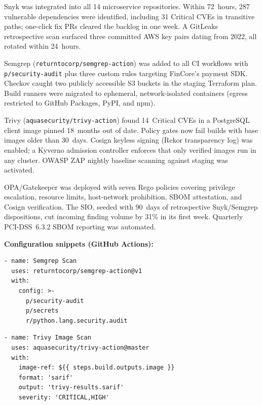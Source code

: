 \documentclass[letterpaper, 10pt, conference]{ieeeconf}
\begin{document}
\begin{description}[font=\bfseries, leftmargin=*, style=nextline]
  \item[Sprint~1 -- Layers~1 and~3.]
  Snyk was integrated into all 14 microservice repositories. Within
  72~hours, 287 vulnerable dependencies were identified, including 31
  Critical CVEs in transitive paths; one-click fix PRs cleared the
  backlog in one week. A GitLeaks retrospective scan surfaced three
  committed AWS key pairs dating from 2022, all rotated within 24~hours.

  \item[Sprint~2 -- Layer~2.]
  Semgrep (\texttt{returntocorp/semgrep-action}) was added to all CI
  workflows with \texttt{p/security-audit} plus three custom rules
  targeting FinCore's payment SDK. Checkov caught two publicly accessible
  S3 buckets in the staging Terraform plan. Build runners were migrated
  to ephemeral, network-isolated containers (egress restricted to GitHub
  Packages, PyPI, and npm).

  \item[Sprint~3 -- Layer~4.]
  Trivy (\texttt{aquasecurity/trivy-action}) found 14~Critical CVEs in a
  PostgreSQL client image pinned 18~months out of date. Policy gates now
  fail builds with base images older than 30~days. Cosign keyless signing
  (Rekor transparency log) was enabled; a Kyverno admission controller
  enforces that only verified images run in any cluster. OWASP ZAP
  nightly baseline scanning against staging was activated.

  \item[Sprint~4 -- Layer~5.]
  OPA/Gatekeeper was deployed with seven Rego policies covering privilege
  escalation, resource limits, host-network prohibition, SBOM attestation,
  and Cosign verification. The SIO, seeded with 90~days of retrospective
  Snyk/Semgrep dispositions, cut incoming finding volume by 31\% in its
  first week. Quarterly PCI-DSS~6.3.2 SBOM reporting was automated.
\end{description}

\textbf{Configuration snippets (GitHub Actions):}
\begin{lstlisting}[style=columnwidth, caption={Semgrep SAST scan}]
- name: Semgrep Scan
  uses: returntocorp/semgrep-action@v1
  with:
    config: >-
      p/security-audit
      p/secrets
      r/python.lang.security.audit
\end{lstlisting}

\begin{lstlisting}[style=columnwidth, caption={Trivy container scan}]
- name: Trivy Image Scan
  uses: aquasecurity/trivy-action@master
  with:
    image-ref: ${{ steps.build.outputs.image }}
    format: 'sarif'
    output: 'trivy-results.sarif'
    severity: 'CRITICAL,HIGH'
\end{lstlisting}
\end{document}
